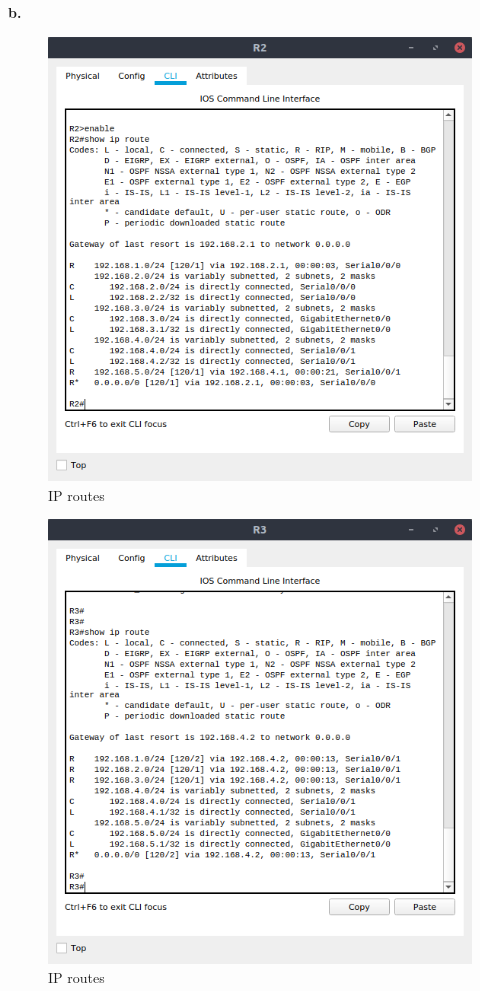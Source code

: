 \documentclass[conference]{IEEEtran}
\begin{document}
\textbf{b.}
\begin{center}
\begin{figure}[h]
\includegraphics[scale=0.45]{../q02b1.png}
\caption{IP routes}
\end{figure}
\begin{figure}[h]
\includegraphics[scale=0.45]{../q02b2.png}
\caption{IP routes}
\end{figure}
\end{center}
\end{document}
